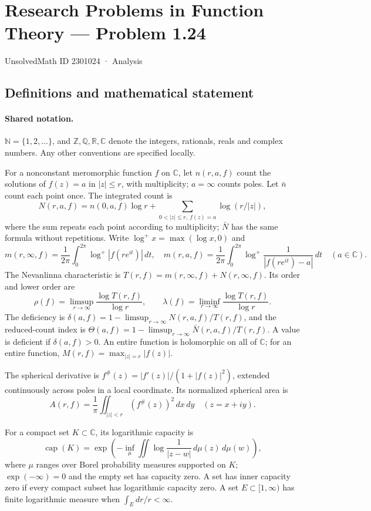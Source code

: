 \documentclass[11pt]{article}
\begin{document}
\setcounter{section}{2301023}
\section{Research Problems in Function Theory — Problem 1.24}\label{2301024}
{\small\sffamily UnsolvedMath ID 2301024 · Analysis}
\subsection{Definitions and mathematical statement}

\paragraph{Shared notation.}$\mathbb N=\{1,2,\ldots\}$, and $\mathbb Z,\mathbb Q,\mathbb R,\mathbb C$ denote the integers, rationals, reals and complex numbers. Any other conventions are specified locally.


For a nonconstant meromorphic function $f$ on $\mathbb C$, let $n(r,a,f)$ count the solutions of $f(z)=a$ in $|z|\le r$, with multiplicity; $a=\infty$ counts poles. Let $\bar n$ count each point once. The integrated count is
\[
 N(r,a,f)=n(0,a,f)\log r+\sum_{0<|z|\le r,\ f(z)=a}\log(r/|z|),
\]
where the sum repeats each point according to multiplicity; $\bar N$ has the same formula without repetitions. Write $\log^+x=\max(\log x,0)$ and
\[
 m(r,\infty,f)=\frac1{2\pi}\int_0^{2\pi}\log^+|f(re^{it})|\,dt,\quad
 m(r,a,f)=\frac1{2\pi}\int_0^{2\pi}\log^+\frac1{|f(re^{it})-a|}\,dt\quad(a\in\mathbb C).
\]
The Nevanlinna characteristic is $T(r,f)=m(r,\infty,f)+N(r,\infty,f)$. Its order and lower order are
\[
 \rho(f)=\limsup_{r\to\infty}\frac{\log T(r,f)}{\log r},\qquad
 \lambda(f)=\liminf_{r\to\infty}\frac{\log T(r,f)}{\log r}.
\]
The deficiency is $\delta(a,f)=1-\limsup_{r\to\infty}N(r,a,f)/T(r,f)$, and the reduced-count index is $\Theta(a,f)=1-\limsup_{r\to\infty}\bar N(r,a,f)/T(r,f)$. A value is deficient if $\delta(a,f)>0$. An entire function is holomorphic on all of $\mathbb C$; for an entire function, $M(r,f)=\max_{|z|=r}|f(z)|$.

The spherical derivative is $f^\#(z)=|f'(z)|/(1+|f(z)|^2)$, extended continuously across poles in a local coordinate. Its normalized spherical area is
\[
 A(r,f)=\frac1\pi\iint_{|z|<r}(f^\#(z))^2\,dx\,dy\quad(z=x+iy).
\]

For a compact set $K\subset\mathbb C$, its logarithmic capacity is
\[
 \operatorname{cap}(K)=\exp\!\left(-\inf_\mu\iint\log\frac1{|z-w|}\,d\mu(z)\,d\mu(w)\right),
\]
where $\mu$ ranges over Borel probability measures supported on $K$; $\exp(-\infty)=0$ and the empty set has capacity zero. A set has inner capacity zero if every compact subset has logarithmic capacity zero. A set $E\subset[1,\infty)$ has finite logarithmic measure when $\int_E dr/r<\infty$.
\end{document}
